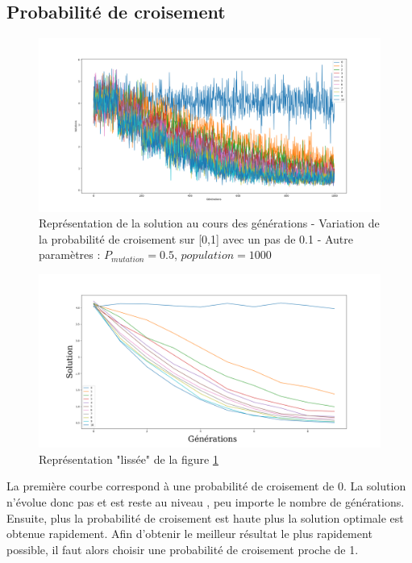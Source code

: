 \documentclass[12pt]{report}
\begin{document}
      \subsection{Probabilité de croisement}

      \begin{figure}[h]
        \centering
        \includegraphics[width=15cm]{img/evo_crossover_brut.png}
        \caption{Représentation de la solution au cours des générations - Variation de la probabilité de croisement sur [0,1] avec un pas de 0.1 - Autre paramètres : $P_{mutation} = 0.5$, $population = 1000$}
        \label{evo_crossover_brut}
      \end{figure}

      \begin{figure}[!]
        \centering
        \includegraphics[width=15cm]{img/evo_crossover_moy.png}
        \caption{Représentation "lissée" de la figure \ref{evo_crossover_brut}}
        \label{evo_crossover_moy}
      \end{figure}

      La première courbe correspond à une probabilité de croisement de 0. La solution n'évolue donc pas et est reste au niveau , peu importe le nombre de générations. Ensuite, plus la probabilité de croisement est haute plus la solution optimale est obtenue rapidement. Afin d'obtenir le meilleur résultat le plus rapidement possible, il faut alors choisir une probabilité de croisement proche de 1.
\end{document}
